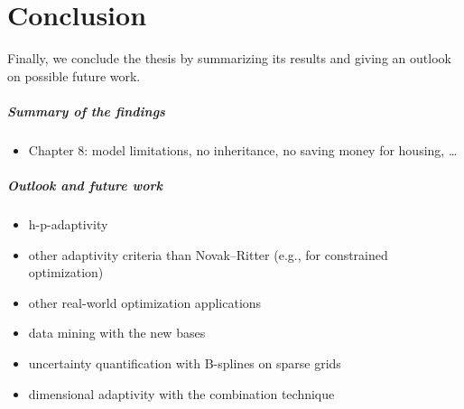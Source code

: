 \chapter{Conclusion}
\label{chap:90conclusion}

\noindent
Finally, we conclude the thesis by summarizing its results
and giving an outlook on possible future work.

\paragraph{Summary of the findings}

\blindtext{}


\begin{itemize}
  \item
  Chapter 8: model limitations, no inheritance,
  no saving money for housing, \dots
\end{itemize}

\paragraph{Outlook and future work}

\blindtext{}


\begin{itemize}
  \item
  h-p-adaptivity
  
  \item
  other adaptivity criteria than Novak--Ritter
  (e.g., for constrained optimization)
  
  \item
  other real-world optimization applications
  
  \item
  data mining with the new bases
  
  \item
  uncertainty quantification with B-splines on sparse grids
  
  \item
  dimensional adaptivity with the combination technique
\end{itemize}

\cleardoublepage
